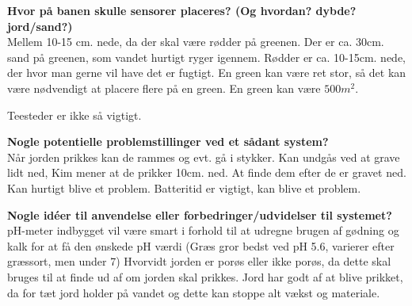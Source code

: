 \textbf{Hvor på banen skulle sensorer placeres? (Og hvordan? dybde? jord/sand?)}\\
Mellem 10-15 cm. nede, da der skal være rødder på greenen. Der er ca. 30cm. sand på greenen, som vandet hurtigt ryger igennem. Rødder er ca. 10-15cm. nede, der hvor man gerne vil have det er fugtigt.
En green kan være ret stor, så det kan være nødvendigt at placere flere på en green. En green kan være $500m^2$.

Teesteder er ikke så vigtigt.

\textbf{Nogle potentielle problemstillinger ved et sådant system?}\\
Når jorden prikkes kan de rammes og evt. gå i stykker. Kan undgås ved at grave lidt ned, Kim mener at de prikker 10cm. ned. 
At finde dem efter de er gravet ned. Kan hurtigt blive et problem. Batteritid er vigtigt, kan blive et problem.

\textbf{Nogle idéer til anvendelse eller forbedringer/udvidelser til systemet?}\\
pH-meter indbygget vil være smart i forhold til at udregne brugen af gødning og kalk for at få den ønskede pH værdi (Græs gror bedst ved pH 5.6, varierer efter græssort, men under 7)
Hvorvidt jorden er porøs eller ikke porøs, da dette skal bruges til at finde ud af om jorden skal prikkes.
Jord har godt af at blive prikket, da for tæt jord holder på vandet og dette kan stoppe alt vækst og materiale.
